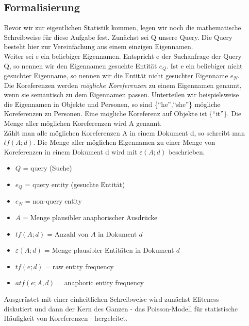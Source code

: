 \subsection{Formalisierung}
Bevor wir zur eigentlichen Statistik kommen, legen wir noch die mathematische Schreibweise für diese Aufgabe fest.
Zunächst sei Q unsere Query. Die Query besteht hier zur Vereinfachung aus einem einzigen Eigennamen.\\
Weiter sei e ein beliebiger Eigennamen. Entspricht e der Suchanfrage der Query Q, so nennen wir den Eigennamen gesuchte Entität $e_Q$. Ist e ein beliebiger nicht gesuchter Eigenname, so nennen wir die Entität nicht gesuchter Eigenname $e_N$.\\
Die Koreferenzen werden \textit{mögliche Koreferenzen} zu einem Eigennamen genannt, wenn sie semantisch zu dem Eigennamen passen. Unterteilen wir beispielsweise die Eigennamen in Objekte und Personen, so sind \{``he'',``she''\} mögliche Koreferenzen zu Personen. Eine mögliche Koreferenz auf Objekte ist \{``it''\}. Die Menge aller möglichen Koreferenzen wird A genannt.\\
Zählt man alle möglichen Koreferenzen A in einem Dokument d, so schreibt man $tf\left( A;d \right)$. Die Menge aller möglichen Eigennamen zu einer Menge von Koreferenzen in einem Dokument d wird mit $\varepsilon\left( A;d \right)$ beschrieben.


 \begin{itemize}
	\item $Q$ = query (Suche)
	\item $e_Q$ = query entity (gesuchte Entität)
	\item $e_N$ = non-query entity
	\item $A$ = Menge plausibler anaphorischer Ausdrücke
	\item $tf(A;d)$ = Anzahl von $A$ in Dokument $d$
	\item $\varepsilon (A;d)$ = Menge plausibler Entitäten in Dokument $d$
	\item $tf(e;d)$ = raw entity frequency
	\item $atf(e;A,d)$ = anaphoric entity frequency
  \end{itemize}

  Ausgerüstet mit einer einheitlichen Schreibweise wird zunächst Eliteness diskutiert und dann der Kern des Ganzen - das Poisson-Modell für statistische Häufigkeit von Koreferenzen - hergeleitet.
